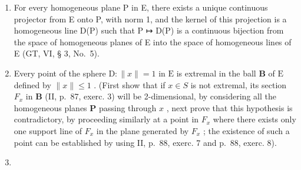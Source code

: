 \begin{enumerate}
\def\labelenumi{\alph{enumi})}
\item
  For every homogeneous plane P in E, there exists a unique continuous projector from E onto P, with norm 1, and the kernel of this projection is a homogeneous line D(P) such that P ↦ D(P) is a continuous bijection from the space of homogeneous planes of E into the space of homogeneous lines of E (GT, VI, § 3, No.~5).
\item
  Every point of the sphere \(\mathrm{D}:\| x\| = 1\) in \(\mathrm{E}\) is extremal in the ball \(\mathbf{B}\) of \(\mathrm{E}\) defined by \(\| x\| \leqslant 1\) . (First show that if \(x\in S\) is not extremal, its section \(F_{x}\) in \(\mathbf{B}\) (II, p.~87, exerc. 3) will be 2-dimensional, by considering all the homogeneous planes \(\mathbf{P}\) passing through \(x\) , next prove that this hypothesis is contradictory, by proceeding similarly at a point in \(F_{x}\) where there exists only one support line of \(F_{x}\) in the plane generated by \(F_{x}\) ; the existence of such a point can be established by using II, p.~88, exerc. 7 and p.~88, exerc. 8).
\item

\end{enumerate}
